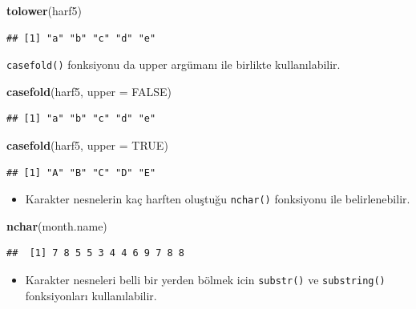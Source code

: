 \documentclass[
  oneside]{book}
\newenvironment{Shaded}{\begin{snugshade}}{\end{snugshade}}
\newcommand{\AttributeTok}[1]{\textcolor[rgb]{0.13,0.29,0.53}{#1}}
\newcommand{\ConstantTok}[1]{\textcolor[rgb]{0.56,0.35,0.01}{#1}}
\newcommand{\FunctionTok}[1]{\textcolor[rgb]{0.13,0.29,0.53}{\textbf{#1}}}
\newcommand{\NormalTok}[1]{#1}
\providecommand{\tightlist}{%
  \setlength{\itemsep}{0pt}\setlength{\parskip}{0pt}}
\begin{document}
\begin{Shaded}
\begin{Highlighting}[]
\FunctionTok{tolower}\NormalTok{(harf5)}
\end{Highlighting}
\end{Shaded}

\begin{verbatim}
## [1] "a" "b" "c" "d" "e"
\end{verbatim}

\texttt{casefold()} fonksiyonu da upper argümanı ile birlikte kullanılabilir.

\begin{Shaded}
\begin{Highlighting}[]
\FunctionTok{casefold}\NormalTok{(harf5, }\AttributeTok{upper =} \ConstantTok{FALSE}\NormalTok{)}
\end{Highlighting}
\end{Shaded}

\begin{verbatim}
## [1] "a" "b" "c" "d" "e"
\end{verbatim}

\begin{Shaded}
\begin{Highlighting}[]
\FunctionTok{casefold}\NormalTok{(harf5, }\AttributeTok{upper =} \ConstantTok{TRUE}\NormalTok{)}
\end{Highlighting}
\end{Shaded}

\begin{verbatim}
## [1] "A" "B" "C" "D" "E"
\end{verbatim}

\begin{itemize}
\tightlist
\item
  Karakter nesnelerin kaç harften oluştuğu \texttt{nchar()} fonksiyonu ile belirlenebilir.
\end{itemize}

\begin{Shaded}
\begin{Highlighting}[]
\FunctionTok{nchar}\NormalTok{(month.name)}
\end{Highlighting}
\end{Shaded}

\begin{verbatim}
##  [1] 7 8 5 5 3 4 4 6 9 7 8 8
\end{verbatim}

\begin{itemize}
\tightlist
\item
  Karakter nesneleri belli bir yerden bölmek icin \texttt{substr()} ve \texttt{substring()} fonksiyonları kullanılabilir.
\end{itemize}
\end{document}
